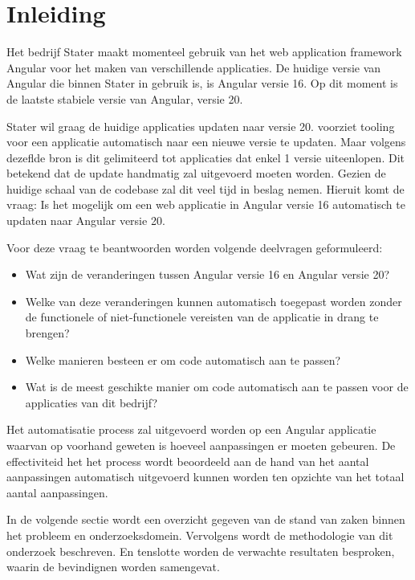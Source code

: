 
\section{Inleiding}
\label{sec:inleiding}

Het bedrijf Stater maakt momenteel gebruik van het web application framework Angular voor het maken van verschillende applicaties.
De huidige versie van Angular die binnen Stater in gebruik is, is Angular versie 16.
Op dit moment is de laatste stabiele versie van Angular, versie 20.

Stater wil graag de huidige applicaties updaten naar versie 20.
\textcite{Angular} voorziet tooling voor een applicatie automatisch naar een nieuwe versie te updaten.
Maar volgens dezeflde bron is dit gelimiteerd tot applicaties dat enkel 1 versie uiteenlopen.
Dit betekend dat de update handmatig zal uitgevoerd moeten worden.
Gezien de huidige schaal van de codebase zal dit veel tijd in beslag nemen.
Hieruit komt de vraag: Is het mogelijk om een web applicatie in Angular versie 16 automatisch te updaten naar Angular versie 20.

Voor deze vraag te beantwoorden worden volgende deelvragen geformuleerd:

\begin{itemize}
  \item Wat zijn de veranderingen tussen Angular versie 16 en Angular versie 20?
  \item Welke van deze veranderingen kunnen automatisch toegepast worden zonder de functionele of niet-functionele vereisten van de applicatie in drang te brengen?
  \item Welke manieren besteen er om code automatisch aan te passen?
  \item Wat is de meest geschikte manier om code automatisch aan te passen voor de applicaties van dit bedrijf?
\end{itemize}

Het automatisatie process zal uitgevoerd worden op een Angular applicatie waarvan op voorhand geweten is hoeveel aanpassingen er moeten gebeuren.
De effectiviteid het het process wordt beoordeeld aan de hand van het aantal aanpassingen automatisch uitgevoerd kunnen worden ten opzichte van het totaal aantal aanpassingen.

In de volgende sectie wordt een overzicht gegeven van de stand van zaken binnen het probleem en onderzoeksdomein.
Vervolgens wordt de methodologie van dit onderzoek beschreven.
En tenslotte worden de verwachte resultaten besproken, waarin de bevindignen worden samengevat.


